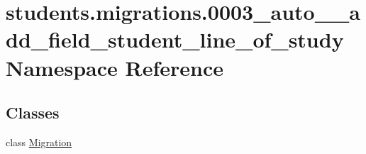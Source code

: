 \hypertarget{namespacestudents_1_1migrations_1_10003__auto____add__field__student__line__of__study}{\section{students.\-migrations.0003\-\_\-auto\-\_\-\-\_\-add\-\_\-field\-\_\-student\-\_\-line\-\_\-of\-\_\-study Namespace Reference}
\label{namespacestudents_1_1migrations_1_10003__auto____add__field__student__line__of__study}
}
\subsection*{Classes}
\begin{DoxyCompactItemize}
\item 
class \hyperlink{classstudents_1_1migrations_1_10003__auto____add__field__student__line__of__study_1_1_migration}{Migration}
\end{DoxyCompactItemize}
